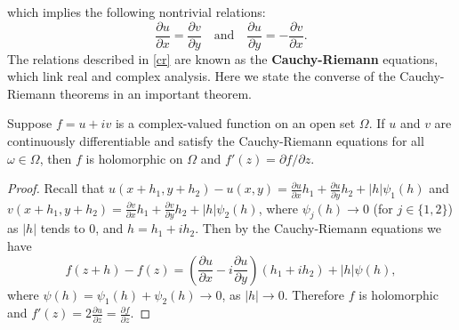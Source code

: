 which implies the following nontrivial relations: 
\begin{equation}\label{cr}
    \frac{\partial u}{\partial x}=\frac{\partial v}{\partial y}\quad \text{and}\quad \frac{\partial u}{\partial y}=-\frac{\partial v}{\partial x}.
\end{equation}
The relations described in \cref{cr} are known as the \textbf{Cauchy-Riemann} equations, which link real and complex analysis. Here we state the converse of the Cauchy-Riemann theorems in an important theorem.
\begin{theorem}
    Suppose $f=u+iv$ is a complex-valued function on an open set $\Omega$. If $u$ and $v$ are continuously differentiable and satisfy the Cauchy-Riemann equations for all $\omega\in \Omega$, then $f$ is holomorphic on $\Omega$ and $f'(z)=\partial f / \partial z$.
\end{theorem}
\begin{proof}
    Recall that $u(x+h_1,y+h_2)-u(x,y)=\frac{\partial u}{\partial x}h_1+\frac{\partial u}{\partial y}h_2+ |h|\psi_1(h) $ and $v(x+h_1,y+h_2)=\frac{\partial v}{\partial x}h_1+\frac{\partial v}{\partial y}h_2+|h|\psi_2(h)$, where $\psi_j(h)\to 0$ (for $j\in \{1,2\} $) as $|h|$ tends to $0$, and $h=h_1+ih_2$. Then by the Cauchy-Riemann equations we have \[
        f(z+h)-f(z)=\left( \frac{\partial u}{\partial x}-i \frac{\partial u}{\partial y} \right) (h_1+ih_2)+|h|\psi(h),
    \] where $\psi(h)=\psi_1(h)+\psi_2(h)\to 0$, as $|h|\to 0$. Therefore $f$ is holomorphic and $f'(z)=2 \frac{\partial u}{\partial z}=\frac{\partial f}{\partial z}$.
\end{proof}



